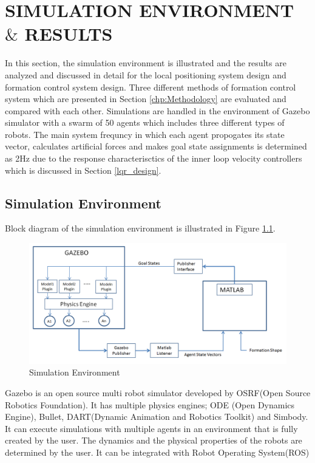 

\chapter{SIMULATION ENVIRONMENT $\&$ RESULTS}
\label{chp:simulation}











In this section, the simulation environment is illustrated and the results are analyzed and discussed in detail for the local positioning system design and formation control system design. Three different methods of formation control system which are presented in Section \ref{chp:Methodology} are evaluated and compared with each other. Simulations are handled in the environment of Gazebo simulator with a swarm of 50 agents which includes three different types of robots. The main system frequncy in which each agent propogates its state vector, calculates artificial forces and makes goal state assignments is determined as 2Hz due to the response characterisctics of the inner loop velocity controllers which is discussed in Section \ref{lqr_design}. 

\section{Simulation Environment}
Block diagram of the simulation environment is illustrated in Figure \ref{simulation_env_ref}.

\begin{figure}[H]
\caption{Simulation Environment} \label{simulation_env_ref}
\centering
\includegraphics[scale = 0.50]{environment}
\end{figure}
    
Gazebo is an open source multi robot simulator developed by OSRF(Open Source Robotics Foundation). It has multiple physics engines; ODE (Open Dynamics Engine), Bullet, DART(Dynamic Animation and Robotics Toolkit) and Simbody. It can execute simulations with multiple agents in an environment that is fully created by the user. The dynamics and the physical properties of the robots are determined by the user. It can be integrated with Robot Operating System(ROS)

